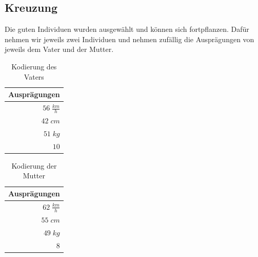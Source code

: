         \subsection{Kreuzung}
            
            Die guten Individuen wurden ausgewählt und können sich fortpflanzen. Dafür nehmen wir jeweils zwei Individuen und nehmen zufällig die Ausprägungen von jeweils dem Vater und der Mutter. 
            \\[10mm]
            \begin{multicols}{2}
                \begin{table}[H]
                    \begin{center}
                    \begin{tabular}{ |r| } 
                        \hline
                        \hfill Ausprägungen  \\ \hline
                        \cellcolor{blue!25} $ 56\; \frac{km}{h}$ \\ \hline
                        \cellcolor{blue!25} $ 42\; cm          $ \\ \hline
                        \cellcolor{blue!25} $ 51\; kg          $ \\ \hline
                        \cellcolor{blue!25} $  10              $ \\ \hline
                    \end{tabular}
                    \end{center}
                    \caption{Kodierung des Vaters \label{fig:somelabel}}
                \end{table}

                \begin{table}[H]
                    \begin{center}
                    \begin{tabular}{ |r| } 
                        \hline
                        \hfill Ausprägungen  \\ \hline
                        \cellcolor{yellow!25} $ 62\; \frac{km}{h}$ \\ \hline
                        \cellcolor{yellow!25} $ 55\; cm          $ \\ \hline
                        \cellcolor{yellow!25} $ 49\; kg          $ \\ \hline
                        \cellcolor{yellow!25} $  8               $ \\ \hline
                    \end{tabular}
                    \end{center}
                    \caption{Kodierung der Mutter \label{fig:somelabel}}
                \end{table}

            \end{multicols}

